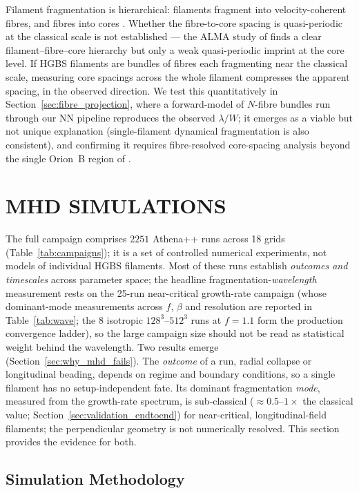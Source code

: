 \documentclass[usenatbib,twoside,twocolumn]{mnras}
\begin{document}
Filament fragmentation is hierarchical: filaments fragment into velocity-coherent fibres, and fibres into cores \citep{Hacar2013,Hacar2018,Yang2024}. Whether the fibre-to-core spacing is quasi-periodic at the classical scale is not established --- the ALMA study of \citet{Yang2024} finds a clear filament--fibre--core hierarchy but only a weak quasi-periodic imprint at the core level. If HGBS filaments are bundles of fibres each fragmenting near the classical scale, measuring core spacings across the whole filament compresses the apparent spacing, in the observed direction. We test this quantitatively in Section~\ref{sec:fibre_projection}, where a forward-model of $N$-fibre bundles run through our NN pipeline reproduces the observed $\lambda/W$; it emerges as a viable but not unique explanation (single-filament dynamical fragmentation is also consistent), and confirming it requires fibre-resolved core-spacing analysis beyond the single Orion~B region of \citet{Yang2024}.

\section{MHD SIMULATIONS}

The full campaign comprises $2251$ Athena++ runs across 18 grids (Table~\ref{tab:campaigns}); it is a set of controlled numerical experiments, not models of individual HGBS filaments. Most of these runs establish \emph{outcomes and timescales} across parameter space; the headline fragmentation-\emph{wavelength} measurement rests on the 25-run near-critical growth-rate campaign (whose dominant-mode measurements across $f$, $\beta$ and resolution are reported in Table~\ref{tab:wave}; the 8 isotropic $128^3$--$512^3$ runs at $f=1.1$ form the production convergence ladder), so the large campaign size should not be read as statistical weight behind the wavelength. Two results emerge (Section~\ref{sec:why_mhd_fails}). The \emph{outcome} of a run, radial collapse or longitudinal beading, depends on regime and boundary conditions, so a single filament has no setup-independent fate. Its dominant fragmentation \emph{mode}, measured from the growth-rate spectrum, is sub-classical ($\approx0.5$--$1\times$ the classical value; Section~\ref{sec:validation_endtoend}) for near-critical, longitudinal-field filaments; the perpendicular geometry is not numerically resolved. This section provides the evidence for both.

\subsection{Simulation Methodology}
\end{document}
